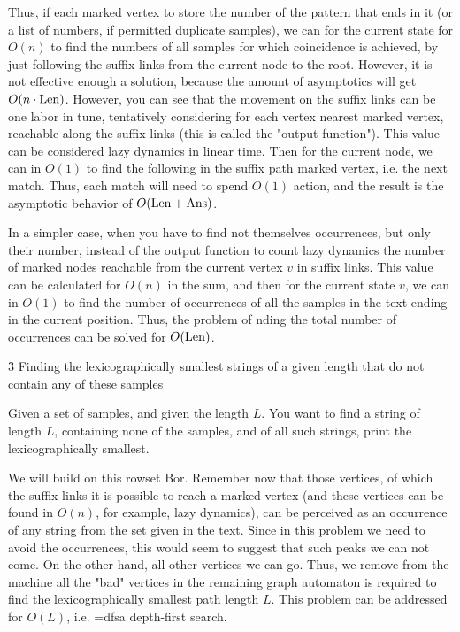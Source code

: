 Thus, if each marked vertex to store the number of the pattern that ends in it (or a list of numbers, if permitted duplicate samples), we can for the current state for $O (n)$ to find the numbers of all samples for which coincidence is achieved, by just following the suffix links from the current node to the root. However, it is not effective enough a solution, because the amount of asymptotics will get $O (n \cdot {\rm Len})$. However, you can see that the movement on the suffix links can be one labor in tune, tentatively considering for each vertex nearest marked vertex, reachable along the suffix links (this is called the "output function"). This value can be considered lazy dynamics in linear time. Then for the current node, we can in $O (1)$ to find the following in the suffix path marked vertex, i.e. the next match. Thus, each match will need to spend $O (1)$ action, and the result is the asymptotic behavior of $O ({\rm Len + Ans})$.

In a simpler case, when you have to find not themselves occurrences, but only their number, instead of the output function to count lazy dynamics the number of marked nodes reachable from the current vertex $v$ in suffix links. This value can be calculated for $O (n)$ in the sum, and then for the current state $v$, we can in $O (1)$ to find the number of occurrences of all the samples in the text ending in the current position. Thus, the problem of nding the total number of occurrences can be solved for $O ({\rm Len})$.


\h3{ Finding the lexicographically smallest strings of a given length that do not contain any of these samples }

Given a set of samples, and given the length $L$. You want to find a string of length $L$, containing none of the samples, and of all such strings, print the lexicographically smallest.

We will build on this rowset Bor. Remember now that those vertices, of which the suffix links it is possible to reach a marked vertex (and these vertices can be found in $O (n)$, for example, lazy dynamics), can be perceived as an occurrence of any string from the set given in the text. Since in this problem we need to avoid the occurrences, this would seem to suggest that such peaks we can not come. On the other hand, all other vertices we can go. Thus, we remove from the machine all the "bad" vertices in the remaining graph automaton is required to find the lexicographically smallest path length $L$. This problem can be addressed for $O (L)$, i.e. \algohref=dfs{a depth-first search}.


